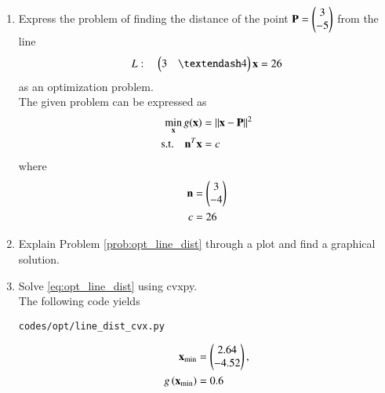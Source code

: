 
\renewcommand{\theequation}{\theenumi}
\begin{enumerate}[label=\thesection.\arabic*.,ref=\thesection.\theenumi]
%
%
\item Express the problem of finding the distance of the point $\mathbf{P}=\begin{pmatrix}3\\-5\end{pmatrix}$ from the line 
\label{prob:opt_line_dist}
\begin{align}
\label{eq:opt_line_nor}
L: \quad \myvec{3 & – 4}\vec{x}  = 26
\end{align}
%
as an optimization problem.
\\
\solution The given problem can be expressed as
%
\begin{align}
\label{eq:opt_line_dist}
\min_{\mathbf{x}}g(\mathbf{x}) &= \left\lVert\mathbf{x}-\mathbf{P}\right\rVert^2
\\
\text{s.t.} \quad \mathbf{n}^T\mathbf{x} &= c
\label{eq:opt_line_dist_nor}
\end{align}
%
where 
%
\begin{align}
\mathbf{n} &= \begin{pmatrix}3\\-4\end{pmatrix}
\\
c&=26
\end{align}
%
\item Explain Problem \ref{prob:opt_line_dist} through a plot and find a graphical solution.
%
\item Solve \eqref{eq:opt_line_dist} using cvxpy.
%
\\
\solution  The following code yields
%	
\begin{lstlisting}
codes/opt/line_dist_cvx.py
\end{lstlisting}
%
\begin{align}
\mathbf{x}_{\min} &= \begin{pmatrix}2.64\\-4.52\end{pmatrix},
\\
g\left(\mathbf{x}_{\min}\right) &= 0.6
\end{align}
%


\end{enumerate}
